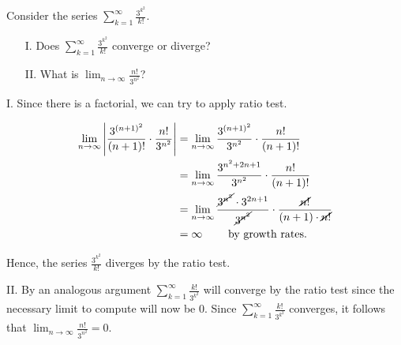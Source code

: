 \documentclass[noauthor]{ximera}
\begin{document}
\begin{problem}
Consider the series $\sum_{k=1}^\infty \frac{3^{k^2}}{k!}$.
\begin{itemize}
\item[I.] Does $\sum_{k=1}^\infty \frac{3^{k^2}}{k!}$ converge or diverge?
\item[II.] What is $\lim_{n \to \infty} \frac{n!}{3^{n^2}}$?
\end{itemize}

\begin{freeResponse}
I.  Since there is a factorial, we can try to apply ratio test.

\begin{align*}
\lim_{n \rightarrow \infty} \left|\frac{3^{(n+1)^2}}{(n+1)!} \cdot \frac{n!}{3^{n^2}} \right| &= \lim_{n \rightarrow \infty} \frac{3^{(n+1)^2}}{3^{n^2}}  \cdot \frac{n!}{(n+1)!} \\
&= \lim_{n \rightarrow \infty} \frac{3^{n^2+2n+1}}{3^{n^2}}  \cdot \frac{n!}{(n+1)!} \\
&= \lim_{n \rightarrow \infty} \frac{\cancel{3^{n^2}} \cdot 3^{2n+1}}{\cancel{3^{n^2}}}  \cdot \frac{\cancel{n!}}{(n+1) \cdot \cancel{n!}} \\
&= \infty \qquad \textrm{ by growth rates. }
\end{align*}

Hence, the series $\frac{3^{k^2}}{k!}$ diverges by the ratio test.

II.  By an analogous argument $\sum_{k=1}^\infty \frac{k!}{3^{k^2}}$ will converge by the ratio test since the necessary limit to compute will now be $0$.  Since $\sum_{k=1}^\infty \frac{k!}{3^{k^2}}$ converges, it follows that $\lim_{n \to \infty} \frac{n!}{3^{n^2}} =0$.
\end{freeResponse}
\end{problem}
\end{document}
